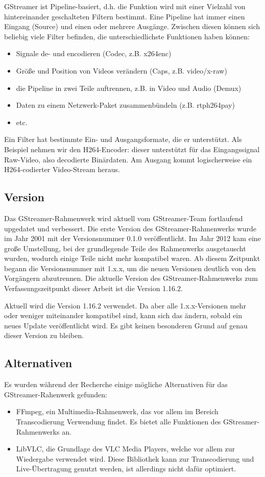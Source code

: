 GStreamer ist Pipeline-basiert, d.h. die Funktion wird mit einer Vielzahl von hintereinander geschalteten Filtern bestimmt.
Eine Pipeline hat immer einen Eingang (Source) und einen oder mehrere Ausgänge.
Zwischen diesen können sich beliebig viele Filter befinden, die unterschiedlichste Funktionen haben können:
\begin{itemize}
    \item Signale de- und encodieren (Codec, z.B. x264enc)
    \item Größe und Position von Videos verändern (Caps, z.B. video/x-raw)
    \item die Pipeline in zwei Teile auftrennen, z.B. in Video und Audio (Demux)
    \item Daten zu einem Netzwerk-Paket zusammenbündeln (z.B. rtph264pay)
    \item etc.
\end{itemize}
Ein Filter hat bestimmte Ein- und Ausgangsformate, die er unterstützt.
Als Beispiel nehmen wir den H264-Encoder:
dieser unterstützt für das Eingangssignal Raw-Video, also decodierte Binärdaten. Am Ausgang kommt logischerweise ein H264-codierter Video-Stream heraus.\par

\subsection{Version}
Das GStreamer-Rahmenwerk wird aktuell vom GStreamer-Team fortlaufend upgedatet und verbessert.
Die erste Version des GStreamer-Rahmenwerks wurde im Jahr 2001 mit der Versionsnummer 0.1.0 veröffentlicht.
Im Jahr 2012 kam eine große Umstellung, bei der grundlegende Teile des Rahmenwerks ausgetauscht wurden, wodurch einige Teile nicht mehr kompatibel waren.
Ab diesem Zeitpunkt begann die Versionsnummer mit 1.x.x, um die neuen Versionen deutlich von den Vorgängern abzutrennen.
Die aktuelle Version des GStreamer-Rahmenwerks zum Verfassungszeitpunkt dieser Arbeit ist die Version 1.16.2.\par

Aktuell wird die Version 1.16.2 verwendet. Da aber alle 1.x.x-Versionen mehr oder weniger miteinander kompatibel sind, kann sich das ändern, sobald ein neues Update veröffentlicht wird. Es gibt keinen besonderen Grund auf genau dieser Version zu bleiben.\par

\subsection{Alternativen}
Es wurden während der Recherche einige mögliche Alternativen für das GStreamer-Rahenwerk gefunden:
\begin{itemize}
    \item FFmpeg, ein Multimedia-Rahmenwerk, das vor allem im Bereich Transcodierung Verwendung findet. Es bietet alle Funktionen des GStreamer-Rahmenwerks an.
    \item LibVLC, die Grundlage des VLC Media Players, welche vor allem zur Wiedergabe verwendet wird. Diese Bibliothek kann zur Transcodierung und Live-Übertragung genutzt werden, ist allerdings nicht dafür optimiert.
\end{itemize}

